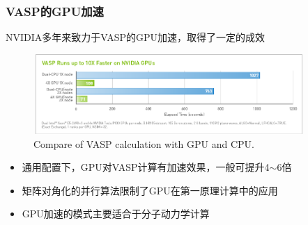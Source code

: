 \frame
{
	\frametitle{\textrm{VASP}的\textrm{GPU}加速}
\textrm{NVIDIA}多年来致力于\textrm{VASP}的\textrm{GPU}加速，取得了一定的成效
\begin{figure}[h!]
	\vspace{-0.15in}
\centering
\includegraphics[height=1.2in,width=4.05in,viewport=0 0 850 260,clip]{Figures/VASP-GPU-CPU.png}
\caption{\tiny \textrm{Compare of VASP calculation with GPU and CPU.}}%
\label{VASP_GPU}
\end{figure} 
\begin{itemize}
	\item 通用配置下，\textrm{GPU}对\textrm{VASP}计算有加速效果，一般可提升4$\sim$6倍
	\item 矩阵对角化的并行算法限制了\textrm{GPU}在第一原理计算中的应用
	\item \textrm{GPU}加速的模式主要适合于分子动力学计算
\end{itemize}
}

